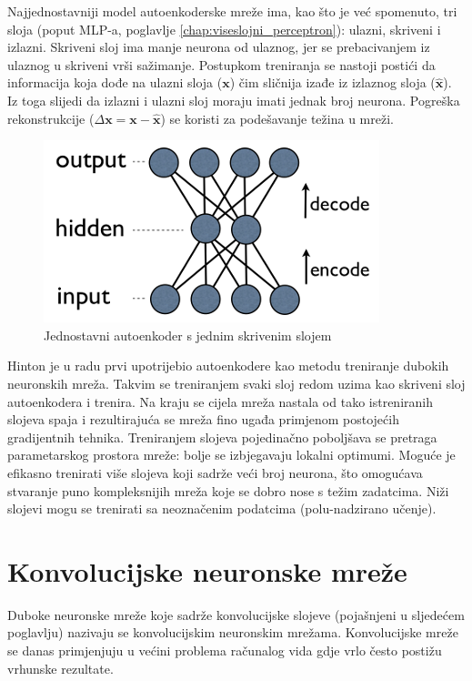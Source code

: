 \documentclass[times, utf8, diplomski, numeric]{fer}
\begin{document}
Najjednostavniji model autoenkoderske mreže ima, kao što je već spomenuto, tri sloja (poput MLP-a, poglavlje \ref{chap:viseslojni_perceptron}): ulazni, skriveni i izlazni. Skriveni sloj ima manje neurona od ulaznog, jer se prebacivanjem iz ulaznog u skriveni vrši sažimanje. Postupkom treniranja se nastoji postići da informacija koja dođe na ulazni sloja ($\boldsymbol{x}$) čim sličnija izađe iz izlaznog sloja ($\hat{\boldsymbol{x}}$). Iz toga slijedi da izlazni i ulazni sloj moraju imati jednak broj neurona. Pogreška rekonstrukcije ($\Delta \boldsymbol{x} = \boldsymbol{x} - \hat{\boldsymbol{x}}$) se koristi za podešavanje težina u mreži.
\begin{figure}[htb]
\centering
\includegraphics{imgs/autoencoder.png}
\caption{Jednostavni autoenkoder s jednim skrivenim slojem}
\label{fig:autoencoder}
\end{figure}

Hinton je u radu \cite{hinton_autoencoder} prvi upotrijebio autoenkodere kao metodu treniranje dubokih neuronskih mreža. Takvim se treniranjem svaki sloj redom uzima kao skriveni sloj autoenkodera i trenira. Na kraju se cijela mreža nastala od tako istreniranih slojeva spaja i rezultirajuća se mreža fino ugađa primjenom postojećih gradijentnih tehnika.
Treniranjem slojeva pojedinačno poboljšava se pretraga parametarskog prostora mreže: bolje se izbjegavaju lokalni optimumi. Moguće je efikasno trenirati više slojeva koji sadrže veći broj neurona, što omogućava stvaranje puno kompleksnijih mreža koje se dobro nose s težim zadatcima. Niži slojevi mogu se trenirati sa neoznačenim podatcima (polu-nadzirano učenje).

\section{Konvolucijske neuronske mreže}
\label{chap:konvolucijske_mreze}

Duboke neuronske mreže koje sadrže konvolucijske slojeve (pojašnjeni u sljedećem poglavlju) nazivaju se konvolucijskim neuronskim mrežama. Konvolucijske mreže se danas primjenjuju u većini problema računalog vida gdje vrlo često postižu vrhunske rezultate.
\end{document}
